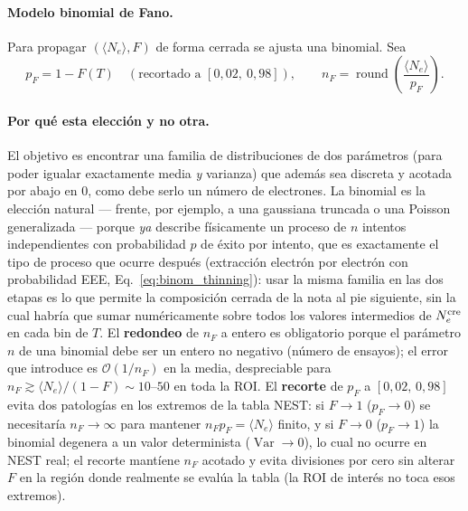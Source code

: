 \documentclass[11pt,a4paper]{article}
\newcommand{\Tnr}{T}
\newcommand{\Ne}{N_{e}}
\begin{document}
\paragraph{Modelo binomial de Fano.} Para propagar $(\langle\Ne\rangle,F)$ de
forma cerrada se ajusta una binomial. Sea
\begin{equation}
  \label{eq:pf_nf}
  p_{F} = 1 - F(\Tnr)\quad(\text{recortado a }[0{,}02,\ 0{,}98]),
  \qquad
  n_{F} = \operatorname{round}\!\left(\frac{\langle\Ne\rangle}{p_{F}}\right).
\end{equation}

\paragraph{Por qu\'e esta elecci\'on y no otra.} El objetivo es encontrar una
familia de distribuciones de dos par\'ametros (para poder igualar exactamente
media \emph{y} varianza) que adem\'as sea discreta y acotada por abajo en $0$,
como debe serlo un n\'umero de electrones. La binomial es la elecci\'on natural
--- frente, por ejemplo, a una gaussiana truncada o una Poisson generalizada
--- porque \emph{ya} describe f\'isicamente un proceso de $n$ intentos
independientes con probabilidad $p$ de \'exito por intento, que es exactamente el
tipo de proceso que ocurre despu\'es (extracci\'on electr\'on por electr\'on con
probabilidad EEE, Eq.~\eqref{eq:binom_thinning}): usar la misma familia en las
dos etapas es lo que permite la composici\'on cerrada de la nota al pie
siguiente, sin la cual habr\'ia que sumar num\'ericamente sobre todos los valores
intermedios de $\Ne^{\rm cre}$ en cada bin de $\Tnr$. El \textbf{redondeo} de
$n_{F}$ a entero es obligatorio porque el par\'ametro $n$ de una binomial debe
ser un entero no negativo (n\'umero de ensayos); el error que introduce es
$\mathcal{O}(1/n_{F})$ en la media, despreciable para $n_{F}\gtrsim\langle
\Ne\rangle/(1-F)\sim10$--$50$ en toda la ROI. El \textbf{recorte} de $p_{F}$ a
$[0{,}02,\,0{,}98]$ evita dos patolog\'ias en los extremos de la tabla NEST: si
$F\to1$ ($p_{F}\to0$) se necesitar\'ia $n_{F}\to\infty$ para mantener
$n_{F}p_{F}=\langle\Ne\rangle$ finito, y si $F\to0$ ($p_{F}\to1$) la binomial
degenera a un valor determinista ($\operatorname{Var}\to0$), lo cual no ocurre
en NEST real; el recorte mant\'iene $n_{F}$ acotado y evita divisiones por cero
sin alterar $F$ en la regi\'on donde realmente se eval\'ua la tabla (la ROI de
inter\'es no toca esos extremos).
\end{document}
